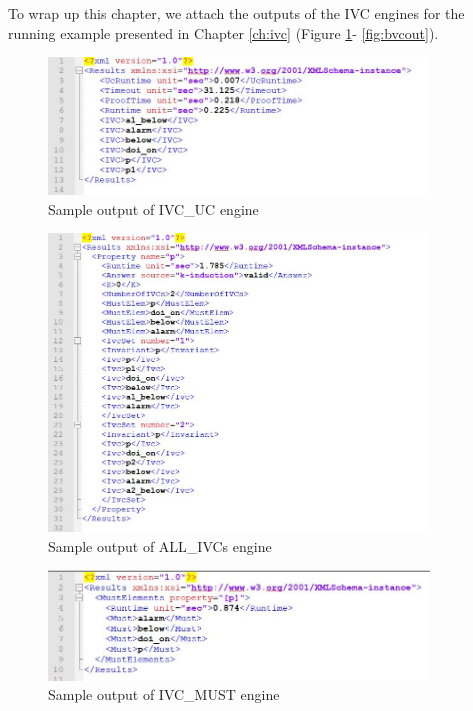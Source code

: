 To wrap up this chapter, we attach the outputs of the IVC engines for the running example presented in Chapter \ref{ch:ivc} (Figure \ref{fig:ucout}- \ref{fig:bvcout}).


\begin{figure}
  \centering
  \includegraphics[width=0.9\textwidth]{figs/ucout.jpg}
  \caption{Sample output of IVC\_UC engine}
  \label{fig:ucout}
\end{figure}

\begin{figure}
  \centering
  \includegraphics[width=0.9\textwidth]{figs/aivcout.jpg}
  \caption{Sample output of ALL\_IVCs engine}
  \label{fig:aivcout}
\end{figure}

\begin{figure}
  \centering
  \includegraphics[width=0.9\textwidth]{figs/mustout.jpg}
  \caption{Sample output of IVC\_MUST engine}
  \label{fig:mustout}
\end{figure}


